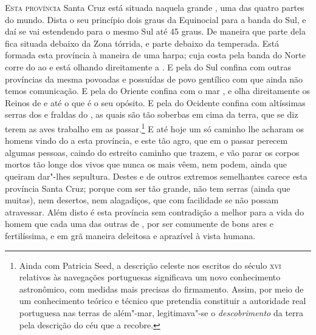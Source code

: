 \noindent\textsc{Esta província} Santa Cruz está situada naquela grande , uma das     
quatro partes do mundo. Dista o seu princípio dois graus da Equinocial				     %
para a banda do Sul, e daí se vai estendendo para o mesmo Sul até
45 graus. De maneira que parte dela fica situada debaixo
da Zona tórrida, e parte debaixo da temperada. Está formada esta
província à maneira de uma harpa; cuja costa pela banda do Norte corre
do  ao  e está olhando direitamente a . E pela
do Sul confina com outras províncias da mesma  povoadas e
possuídas de povo gentílico com que ainda não temos comunicação. E pela 		%
do Oriente confina com o mar , e olha direitamente os
Reinos de  e  até o  que é o seu
opósito. E pela do Ocidente confina com altíssimas serras dos  e
fraldas do , as quais são tão soberbas em cima da terra, que se diz
terem as aves trabalho em as passar.\footnote{ Ainda com Patricia Seed,
a descrição celeste nos escritos do século \textsc{xvi} relativos às navegações
portuguesas significava um novo conhecimento astronômico, com medidas
mais precisas do firmamento. Assim, por meio de um conhecimento teórico
e técnico que pretendia constituir a autoridade real portuguesa nas
terras de além"-mar, legitimava"-se o \textit{descobrimento} da terra
pela descrição do céu que a recobre.} E até hoje um
só caminho lhe acharam os homens vindo do  a esta província, e este
tão agro, que em o passar perecem algumas pessoas, caindo do estreito			%
caminho que trazem, e vão parar os corpos mortos tão longe dos vivos
que nunca os mais vêem, nem podem, ainda que queiram dar"-lhes sepultura.
Destes e de outros extremos semelhantes carece esta província Santa			%
Cruz; porque com ser tão grande, não tem serras (ainda que muitas), nem
desertos, nem alagadiços, que com facilidade se não possam atravessar.
Além disto é esta província sem contradição a melhor para a vida do
homem que cada uma das outras de , por ser comumente de bons ares
e fertilíssima, e em grã maneira deleitosa e aprazível à vista
humana.

